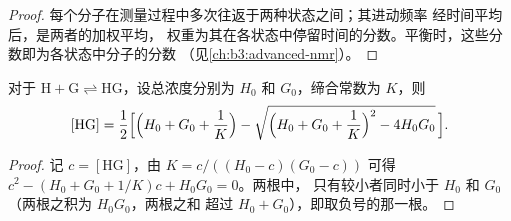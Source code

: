 \begin{proof}
每个分子在测量过程中多次往返于两种状态之间；其进动频率
经时间平均后，是两者的加权平均，
权重为其在各状态中停留时间的分数。平衡时，这些分数即为各状态中分子的分数
（见\cref{ch:b3:advanced-nmr}）。
\end{proof}

\begin{theorem}\label{thm:b3:supramolecular:isotherm}
对于 $\mathrm{H + G \rightleftharpoons HG}$，设总浓度分别为 $H_0$ 和 $G_0$，缔合常数为 $K$，则
\[
  [\mathrm{HG}] = \frac{1}{2}\Bigl[\Bigl(H_0 + G_0 + \frac1K\Bigr) - \sqrt{\Bigl(H_0 + G_0 + \frac1K\Bigr)^2 - 4H_0G_0}\,\Bigr].
\]
\end{theorem}

\begin{proof}
记 $c = [\mathrm{HG}]$，由 $K = c/((H_0 - c)(G_0 - c))$ 可得 $c^2 - (H_0 + G_0 + 1/K)c + H_0G_0 = 0$。两根中，
只有较小者同时小于 $H_0$ 和 $G_0$（两根之积为 $H_0G_0$，两根之和
超过 $H_0 + G_0$），即取负号的那一根。
\end{proof}

